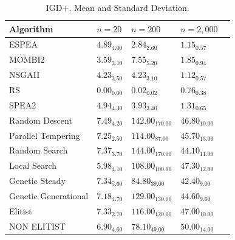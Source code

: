 \begin{table}[H]
    \centering
    {%
    \begin{tabular}{lllll}
    \hline
    Algorithm & $n=20$ & $n=200$ & $n=2,000$ \\
    \hline
    ESPEA                & $  4.89_{ 4.00}$                   & \cellcolor{gray25}$  2.84_{ 2.60}$ & $  1.15_{ 0.57}$                  \\
    MOMBI2                & \cellcolor{gray25}$  3.59_{ 3.10}$ & $ 7.55_{ 5.20}$                    & $  1.85_{ 0.94}$                 \\
    NSGAII               & $  4.23_{3.50}$                   & $  4.23_{ 3.10}$                    & \cellcolor{gray25}$  1.12_{0.57}$ \\
    RS                   & \cellcolor{gray95}$ 0.00_{ 0.00}$ & \cellcolor{gray95}$  0.02_{0.02}$   & \cellcolor{gray95}$  0.76_{0.38}$ \\
    SPEA2                & $  4.94_{4.30}$                   & $   3.93_{3.40}$                 & $  1.31_{0.65}$                      \\
    Random Descent       & $7.49_{ 4.20}$                      & $  142.00_{ 170.00}$            & $  46.80_{ 10.00}$              \\
    Parallel Tempering   & $7.25_{ 2.50}$                      & $  114.00_{  87.00}$            & $  45.70_{ 13.00}$              \\
    Random Search        & $7.37_{ 3.70}$                      & $  144.00_{ 170.00}$            & $  44.10_{ 11.00}$              \\
    Local Search         & $5.98_{ 4.10}$                      & $  108.00_{ 100.00}$            & $  47.30_{ 12.00}$              \\
    Genetic Steady       & $7.34_{ 5.60}$                      & $   84.80_{  39.00}$            & $  42.40_{  9.00}$              \\
    Genetic Generational & $7.18_{ 4.70}$                      & $  129.00_{ 130.00}$            & $  44.60_{  9.60}$              \\
    Elitist              & $7.33_{ 2.70}$                      & $  116.00_{ 120.00}$            & $  47.00_{ 10.00}$              \\
    NON ELITIST          & $6.90_{ 4.60}$                      & $   78.10_{  49.00}$            & $  50.00_{ 14.00}$              \\
    \hline
    \end{tabular}%
    }
    \caption{IGD+. Mean and Standard Deviation.}
    \label{tab:me_std_che_igdp}
\end{table}

